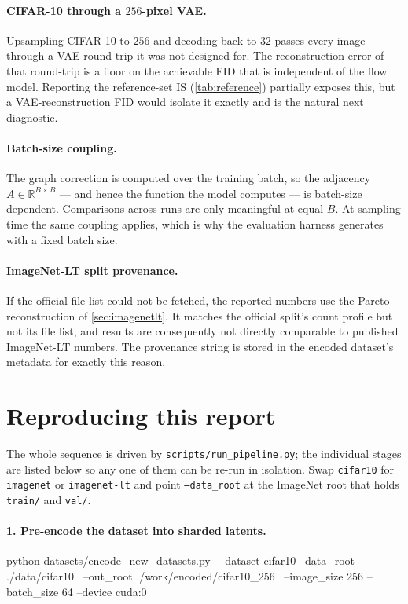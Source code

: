 \documentclass[11pt]{article}
\newcommand{\code}[1]{\texttt{\small #1}}
\begin{document}
\paragraph{CIFAR-10 through a $256$-pixel VAE.}
Upsampling CIFAR-10 to $256$ and decoding back to $32$ passes every image
through a VAE round-trip it was not designed for. The reconstruction error of
that round-trip is a floor on the achievable FID that is independent of the flow
model. Reporting the reference-set IS (\cref{tab:reference}) partially exposes
this, but a VAE-reconstruction FID would isolate it exactly and is the natural
next diagnostic.

\paragraph{Batch-size coupling.}
The graph correction is computed over the training batch, so the adjacency
$A \in \mathbb{R}^{B\times B}$ --- and hence the function the model computes --- is
batch-size dependent. Comparisons across runs are only meaningful at equal $B$.
At sampling time the same coupling applies, which is why the evaluation harness
generates with a fixed batch size.

\paragraph{ImageNet-LT split provenance.}
If the official file list could not be fetched, the reported numbers use the
Pareto reconstruction of \cref{sec:imagenetlt}. It matches the official split's
count profile but not its file list, and results are consequently not directly
comparable to published ImageNet-LT numbers. The provenance string is stored in
the encoded dataset's metadata for exactly this reason.

\section{Reproducing this report}
\label{sec:repro}

The whole sequence is driven by \code{scripts/run\_pipeline.py}; the individual
stages are listed below so any one of them can be re-run in isolation. Swap
\code{cifar10} for \code{imagenet} or \code{imagenet-lt} and point
\code{--data\_root} at the ImageNet root that holds \code{train/} and
\code{val/}.

\paragraph{1. Pre-encode the dataset into sharded latents.}
\begin{shell}
python datasets/encode_new_datasets.py \
    --dataset cifar10 --data_root ./data/cifar10 \
    --out_root ./work/encoded/cifar10_256 \
    --image_size 256 --batch_size 64 --device cuda:0
\end{shell}
\end{document}
